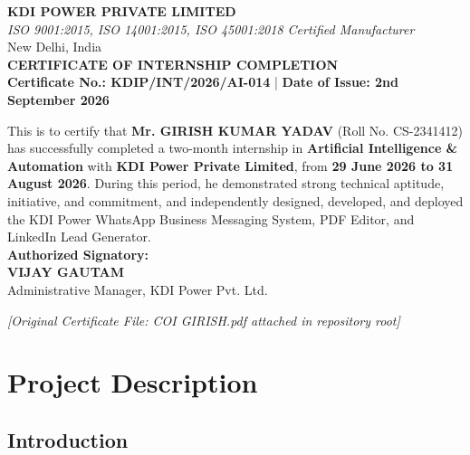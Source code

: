 \documentclass[12pt,a4paper]{report}
\begin{document}
\begin{notebox}
\begin{center}
\textbf{KDI POWER PRIVATE LIMITED}\\
\textit{ISO 9001:2015, ISO 14001:2015, ISO 45001:2018 Certified Manufacturer}\\
New Delhi, India\\[0.5cm]
\textbf{CERTIFICATE OF INTERNSHIP COMPLETION}\\
\textbf{Certificate No.: KDIP/INT/2026/AI-014} | \textbf{Date of Issue: 2nd September 2026}\\[0.5cm]
\end{center}

This is to certify that \textbf{Mr. GIRISH KUMAR YADAV} (Roll No. CS-2341412) has successfully completed a two-month internship in \textbf{Artificial Intelligence \& Automation} with \textbf{KDI Power Private Limited}, from \textbf{29 June 2026 to 31 August 2026}. During this period, he demonstrated strong technical aptitude, initiative, and commitment, and independently designed, developed, and deployed the KDI Power WhatsApp Business Messaging System, PDF Editor, and LinkedIn Lead Generator.\\[0.5cm]

\textbf{Authorized Signatory:}\\
\textbf{VIJAY GAUTAM}\\
Administrative Manager, KDI Power Pvt. Ltd.
\end{notebox}

\vspace{1cm}
\begin{center}
\textit{[Original Certificate File: COI GIRISH.pdf attached in repository root]}
\end{center}

\newpage

\tableofcontents
\newpage

\listoffigures
\newpage

\chapter{Project Description}

\section{Introduction}
\end{document}
